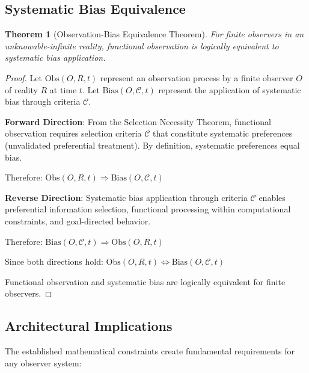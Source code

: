 \documentclass[12pt,a4paper]{article}
\newtheorem{theorem}{Theorem}[section]
\begin{document}
\subsection{Systematic Bias Equivalence}

\begin{theorem}[Observation-Bias Equivalence Theorem]
For finite observers in an unknowable-infinite reality, functional observation is logically equivalent to systematic bias application.
\end{theorem}

\begin{proof}
Let $\text{Obs}(O, R, t)$ represent an observation process by a finite observer $O$ of reality $R$ at time $t$.
Let $\text{Bias}(O, \mathcal{C}, t)$ represent the application of systematic bias through criteria $\mathcal{C}$.

\textbf{Forward Direction}: From the Selection Necessity Theorem, functional observation requires selection criteria $\mathcal{C}$ that constitute systematic preferences (unvalidated preferential treatment). By definition, systematic preferences equal bias.

Therefore: $\text{Obs}(O, R, t) \Rightarrow \text{Bias}(O, \mathcal{C}, t)$

\textbf{Reverse Direction}: Systematic bias application through criteria $\mathcal{C}$ enables preferential information selection, functional processing within computational constraints, and goal-directed behavior.

Therefore: $\text{Bias}(O, \mathcal{C}, t) \Rightarrow \text{Obs}(O, R, t)$

Since both directions hold: $\text{Obs}(O, R, t) \Leftrightarrow \text{Bias}(O, \mathcal{C}, t)$

Functional observation and systematic bias are logically equivalent for finite observers.
\end{proof}

\subsection{Architectural Implications}

The established mathematical constraints create fundamental requirements for any observer system:
\end{document}
